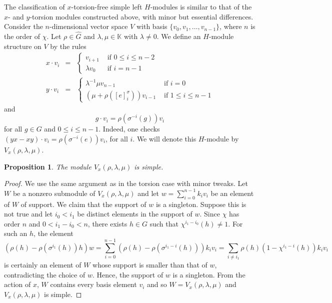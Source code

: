 \documentclass[11pt, twoside]{amsart}
\newtheorem{proposition}[theorem]{Proposition}
\theoremstyle{definition}
\newcommand{\KK}{\mathbb{K}}
\newcommand{\wind}[2]{[#1]_{#2}^{\sigma}}
\begin{document}
The classification of $x$-torsion-free simple left $H$-modules is similar
to that of the $x$- and $y$-torsion modules constructed above, with
minor but essential differences. Consider the $n$-dimensional vector space $V$ with basis $\{v_0, v_1, \ldots, v_{n-1}\}$, where $n$ is the order of $\chi$.  Let  $\rho\in \widehat{G}$ and  $\lambda, \mu \in \KK$ with $\lambda \neq 0$. We define an $H$-module structure on $V$ by the rules
%
\begin{eqnarray*}
x\cdot v_i &=& \begin{cases}
    v_{i+1} & \text{ if } 0 \leq i \leq n-2\\ \lambda v_0 & \text{ if } i = n-1
\end{cases}\\
y\cdot v_i &=& \begin{cases}
    \lambda^{-1}\mu v_{n-1} & \text{ if } i = 0\\ (\mu + \rho(\wind{e}{i}))v_{i-1} & \text{ if } 1 \leq i \leq n-1
\end{cases}
\end{eqnarray*}
%
and
%
\[g\cdot v_i = \rho(\sigma^{-i}(g)) v_i\]
%
for all $g\in G$ and $0 \leq i \leq n-1$. Indeed, one checks $(yx-xy)\cdot v_i = \rho(\sigma^{-i}(e))v_i$, 
 for all $i$. We will denote this $H$-module by $V_x (\rho, \lambda, \mu)$. 
%
\begin{proposition}
    The module $V_x (\rho, \lambda, \mu)$ is simple.
\end{proposition}
\begin{proof}
We use the same argument as in the torsion case with minor tweaks. Let $W$ be a nonzero submodule of $V_x (\rho, \lambda, \mu)$ and let $w = \sum_{i=0}^{n-1}k_i v_i$ be an element of $W$ of support. We claim that the support of $w$ is a singleton. Suppose this is not true and let $i_0 < i_1$ be distinct elements in the support of $w$. 
Since $\chi$ has order  $n$ and $0<i_1-i_0<n$, there exists $h\in G$ such that $\chi^{i_1-i_0}(h)\neq1$. For such an $h$, the element 
    \begin{equation*}
      \left(\rho(h) - \rho(\sigma^{i_1}(h))h\right)w  = \sum_{i=0}^{n-1}\left(\rho(h) - \rho(\sigma^{i_1 - i}(h))\right)k_i v_i   = \sum_{i\neq i_1}\rho(h)(1 - \chi^{i_1 - i}(h))k_i v_i
    \end{equation*}
    is certainly an element of $W$ whose support is smaller than that of $w$, contradicting the choice of $w$. Hence, the support of $w$ is a singleton. From the action of $x$, $W$ contains every basis element $v_i$ and so $W = V_x (\rho, \lambda, \mu)$ and $V_x (\rho, \lambda, \mu)$ is simple.
\end{proof}
\end{document}

